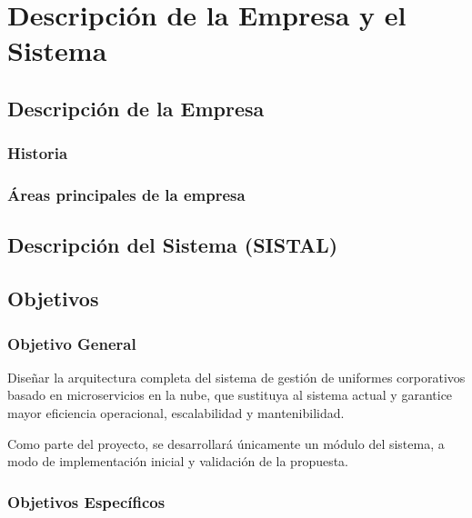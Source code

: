 \chapter{Descripción de la Empresa y el Sistema}

\section{Descripción de la Empresa}

\subsection{Historia}



\subsection{Áreas principales de la empresa}

\section{Descripción del Sistema (SISTAL)}

\section{Objetivos}

\subsection{Objetivo General}

Diseñar la arquitectura completa del sistema de gestión de uniformes corporativos basado en microservicios en la nube, que sustituya al sistema actual y garantice mayor eficiencia operacional, escalabilidad y mantenibilidad.

Como parte del proyecto, se desarrollará únicamente un módulo del sistema, a modo de implementación inicial y validación de la propuesta.


\subsection{Objetivos Específicos}

